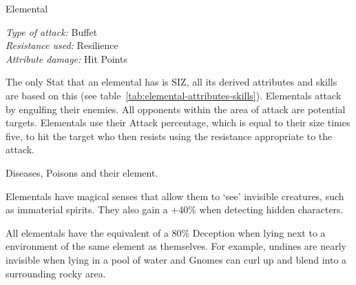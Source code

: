\begin{monsterbox}{Elemental}
\begin{rpg-monsteraction}[Sylphs]
		\textit{Type of attack:} Buffet\\
		\textit{Resistance used:} Resilience\\
		\textit{Attribute damage:} Hit Points
	\end{rpg-monsteraction}
	\begin{rpg-monsteraction}[Attributes]
		The only Stat that an elemental has is SIZ, all its derived attributes and skills are based on this (see table~\ref{tab:elemental-attributes-skills}). Elementals attack by engulfing their enemies. All opponents within the area of attack are potential targets. Elementals use their Attack percentage, which is equal to their size times five, to hit the target who then resists using the resistance appropriate to the attack.
	\end{rpg-monsteraction}
	\begin{rpg-monsteraction}[Immunities]
		Diseases, Poisons and their element.
	\end{rpg-monsteraction}
	\begin{rpg-monsteraction}
		Elementals have magical senses that allow them to ‘see’ invisible creatures, such as immaterial spirits. They also gain a +40\% when detecting hidden characters.
	\end{rpg-monsteraction}
	\begin{rpg-monsteraction}[Camouflage]
		All elementals have the equivalent of a 80\% Deception when lying next to a environment of the same element as themselves. For example, undines are nearly invisible when lying in a pool of water and Gnomes can curl up and blend into a surrounding rocky area.
	\end{rpg-monsteraction}

\end{monsterbox}



